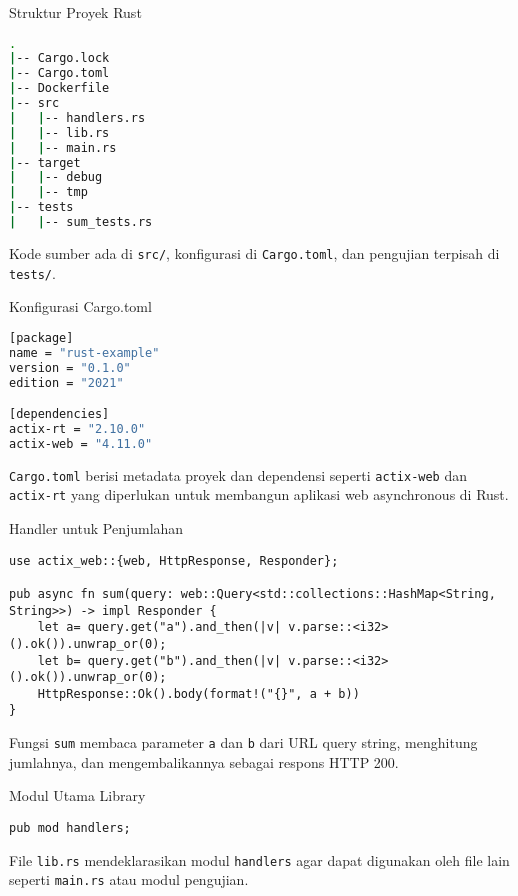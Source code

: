 \documentclass[aspectratio=169, table]{beamer}
\begin{document}
\begin{frame}[fragile]{Struktur Proyek Rust}
\vspace{20pt}
\begin{lstlisting}[language=bash]
.
|-- Cargo.lock
|-- Cargo.toml
|-- Dockerfile
|-- src
|   |-- handlers.rs
|   |-- lib.rs
|   |-- main.rs
|-- target
|   |-- debug
|   |-- tmp
|-- tests
|   |-- sum_tests.rs
\end{lstlisting}

Kode sumber ada di \texttt{src/}, konfigurasi di \texttt{Cargo.toml}, dan pengujian terpisah di \texttt{tests/}.
\end{frame}


\begin{frame}[fragile]{Konfigurasi Cargo.toml}
\begin{lstlisting}[language=bash]
[package]
name = "rust-example"
version = "0.1.0"
edition = "2021"

[dependencies]
actix-rt = "2.10.0"
actix-web = "4.11.0"
\end{lstlisting}

\texttt{Cargo.toml} berisi metadata proyek dan dependensi seperti \texttt{actix-web} dan \texttt{actix-rt} yang diperlukan untuk membangun aplikasi web asynchronous di Rust.
\end{frame}


\begin{frame}[fragile]{Handler untuk Penjumlahan}
\begin{lstlisting}[style=RustStyle]
use actix_web::{web, HttpResponse, Responder};

pub async fn sum(query: web::Query<std::collections::HashMap<String, String>>) -> impl Responder {
	let a= query.get("a").and_then(|v| v.parse::<i32>().ok()).unwrap_or(0);
	let b= query.get("b").and_then(|v| v.parse::<i32>().ok()).unwrap_or(0);
	HttpResponse::Ok().body(format!("{}", a + b))
}
\end{lstlisting}

Fungsi \texttt{sum} membaca parameter \texttt{a} dan \texttt{b} dari URL query string, menghitung jumlahnya, dan mengembalikannya sebagai respons HTTP 200.
\end{frame}

\begin{frame}[fragile]{Modul Utama Library}
\begin{lstlisting}[style=RustStyle, caption={src/lib.rs}]
pub mod handlers;
\end{lstlisting}

File \texttt{lib.rs} mendeklarasikan modul \texttt{handlers} agar dapat digunakan oleh file lain seperti \texttt{main.rs} atau modul pengujian.
\end{frame}
\end{document}

